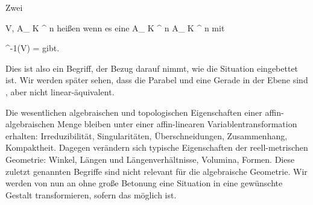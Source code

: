 {}
{





Zwei

\mavergleichskette
{\vergleichskette
{ V, 
}
{ \subseteq }{ { {\mathbb A}_{  K }^{  n   } }
}
{  }{
}
{    }{
}
{   }{
}
}
{}{}{}
heißen  wenn es eine
\maabb {\varphi} { { {\mathbb A}_{  K }^{  n   } }  } { { {\mathbb A}_{  K }^{  n   } }
} {}
mit

\mavergleichskettedisp
{\vergleichskette
{ \varphi^{-1}(V)
}
{ =} {
}
{ } {
}
{ } {
}
{ } {
}
}
{}{}{}
gibt.





}

Dies ist also ein Begriff, der Bezug darauf nimmt, wie die Situation eingebettet ist. Wir werden später sehen, dass die Parabel und eine Gerade in der Ebene  sind
 {} {,}
aber nicht linear-äquivalent.

Die wesentlichen algebraischen und topologischen Eigenschaften einer affin-algebraischen Menge bleiben unter einer affin-linearen Variablentransformation erhalten: Irreduzibilität, Singularitäten, Überschneidungen, Zusammenhang, Kompaktheit. Dagegen verändern sich typische Eigenschaften der reell-metrischen Geometrie: Winkel, Längen und Längenverhältnisse, Volumina, Formen. Diese zuletzt genannten Begriffe sind nicht relevant für die algebraische Geometrie. Wir werden von nun an ohne große Betonung eine Situation in eine gewünschte Gestalt transformieren, sofern das möglich ist.





